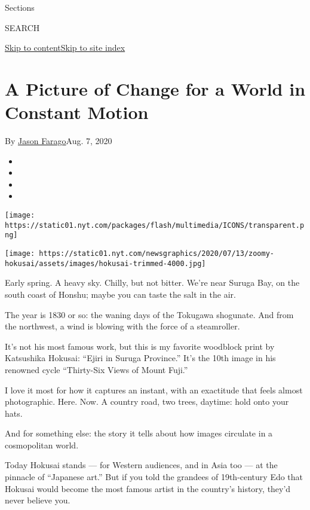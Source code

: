 Sections

SEARCH

\protect\hyperlink{site-content}{Skip to
content}\protect\hyperlink{site-index}{Skip to site index}

\hypertarget{a-picture-of-change-for-a-world-in-constant-motion}{%
\section{A Picture of Change for a World in Constant
Motion}\label{a-picture-of-change-for-a-world-in-constant-motion}}

By \href{https://www.nytimes.com/by/jason-farago}{Jason Farago}Aug. 7,
2020

\begin{itemize}
\item
\item
\item
\item
\end{itemize}

\texttt{[image: https://static01.nyt.com/packages/flash/multimedia/ICONS/transparent.png]}

\texttt{[image: https://static01.nyt.com/newsgraphics/2020/07/13/zoomy-hokusai/assets/images/hokusai-trimmed-4000.jpg]}

Early spring. A heavy sky. Chilly, but not bitter. We're near Suruga
Bay, on the south coast of Honshu; maybe you can taste the salt in the
air.

The year is 1830 or so: the waning days of the Tokugawa shogunate. And
from the northwest, a wind is blowing with the force of a steamroller.

It's not his most famous work, but this is my favorite woodblock print
by Katsushika Hokusai: ``Ejiri in Suruga Province.'' It's the 10th image
in his renowned cycle ``Thirty-Six Views of Mount Fuji.''

I love it most for how it captures an instant, with an exactitude that
feels almost photographic. Here. Now. A country road, two trees,
daytime: hold onto your hats.

And for something else: the story it tells about how images circulate in
a cosmopolitan world.

Today Hokusai stands --- for Western audiences, and in Asia too --- at
the pinnacle of ``Japanese art.'' But if you told the grandees of
19th-century Edo that Hokusai would become the most famous artist in the
country's history, they'd never believe you.

